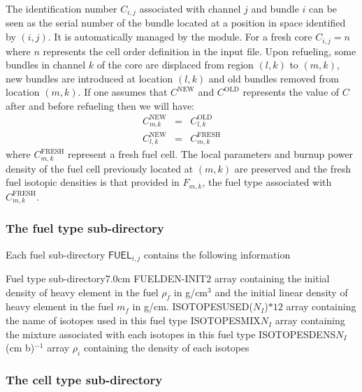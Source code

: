 The identification number $C_{i,j}$ associated with channel $j$ and bundle $i$ can be seen as the serial number of the
bundle located at a position in space identified by $(i,j)$. It is automatically managed by the 
module.\cite{Marleau2004a} For a fresh core $C_{i,j}=n$ where $n$ represents the cell order definition in the input
file. Upon refueling, some bundles in channel $k$ of the core are displaced from region $(l,k)$ to
$(m,k)$, new bundles are introduced at location $(l,k)$ and old bundles removed from location $(m,k)$. If one assumes
that $C^{\mathrm{NEW}}$ and $C^{\mathrm{OLD}}$ represents the value of $C$ after and before refueling then we will
have:
\begin{eqnarray*}
 C^{\mathrm{NEW}}_{m.k}&=&C^{\mathrm{OLD}}_{l,k} \\
 C^{\mathrm{NEW}}_{l,k}&=&C^{\mathrm{FRESH}}_{m,k} 
\end{eqnarray*}
\noindent where $C^{\mathrm{FRESH}}_{m,k}$ represent a fresh fuel cell. The local parameters and burnup power density of the
fuel cell previously located at $(m,k)$ are preserved and the fresh fuel isotopic densities is that provided in
$F_{m,k}$, the fuel type associated with $C^{\mathrm{FRESH}}_{m,k}$.

\subsubsection{The fuel type sub-directory}\label{sect:historydirfuel}

Each fuel sub-directory $\mathsf{FUEL}_{i,j}$ contains the following information

\begin{DescriptionEnregistrement}{Fuel type sub-directory}{7.0cm}
\RealEnr
  {FUELDEN-INIT}{$2$}{}
  {array containing the initial density of heavy element in the fuel $\rho_{f}$ in g/cm$^{3}$ and the initial linear
density of heavy element in the fuel $m_{f}$ in g/cm.}
\CharEnr
  {ISOTOPESUSED}{($N_{I}$)$*12$}
  {array containing the name of isotopes used in this fuel type}
\IntEnr
  {ISOTOPESMIX}{$N_{I}$}
  {array containing the mixture associated with each isotopes in this fuel type}
\RealEnr
  {ISOTOPESDENS}{$N_{I}$}{(cm b)$^{-1}$}
  {array $\rho_{i}$ containing the density of each isotopes}
 \end{DescriptionEnregistrement}

\subsubsection{The cell type sub-directory}\label{sect:historydircell}

